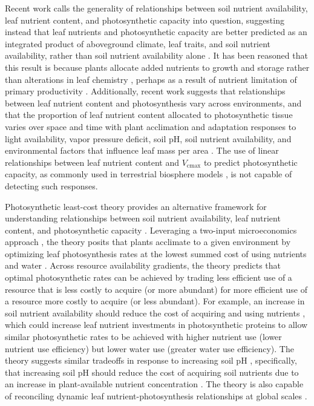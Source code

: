 Recent work calls the generality of relationships between soil nutrient availability, leaf nutrient content, and photosynthetic capacity into question, suggesting instead that leaf nutrients and photosynthetic capacity are better predicted as an integrated product of aboveground climate, leaf traits, and soil nutrient availability, rather than soil nutrient availability alone . It has been reasoned that this result is because plants allocate added nutrients to growth and storage rather than alterations in leaf chemistry , perhaps as a result of nutrient limitation of primary productivity . Additionally, recent work suggests that relationships between leaf nutrient content and photosynthesis vary across environments, and that the proportion of leaf nutrient content allocated to photosynthetic tissue varies over space and time with plant acclimation and adaptation responses to light availability, vapor pressure deficit, soil pH, soil nutrient availability, and environmental factors that influence leaf mass per area . The use of linear relationships between leaf nutrient content and $V_\mathrm{cmax}$ to predict photosynthetic capacity, as commonly used in terrestrial biosphere models , is not capable of detecting such responses.

Photosynthetic least-cost theory provides an alternative framework for understanding relationships between soil nutrient availability, leaf nutrient content, and photosynthetic capacity . Leveraging a two-input microeconomics approach , the theory posits that plants acclimate to a given environment by optimizing leaf photosynthesis rates at the lowest summed cost of using nutrients and water . Across resource availability gradients, the theory predicts that optimal photosynthetic rates can be achieved by trading less efficient use of a resource that is less costly to acquire (or more abundant) for more efficient use of a resource more costly to acquire (or less abundant). For example, an increase in soil nutrient availability should reduce the cost of acquiring and using nutrients , which could increase leaf nutrient investments in photosynthetic proteins to allow similar photosynthetic rates to be achieved with higher nutrient use (lower nutrient use efficiency) but lower water use (greater water use efficiency). The theory suggests similar tradeoffs in response to increasing soil pH , specifically, that increasing soil pH should reduce the cost of acquiring soil nutrients due to an increase in plant-available nutrient concentration . The theory is also capable of reconciling dynamic leaf nutrient-photosynthesis relationships at global scales .

